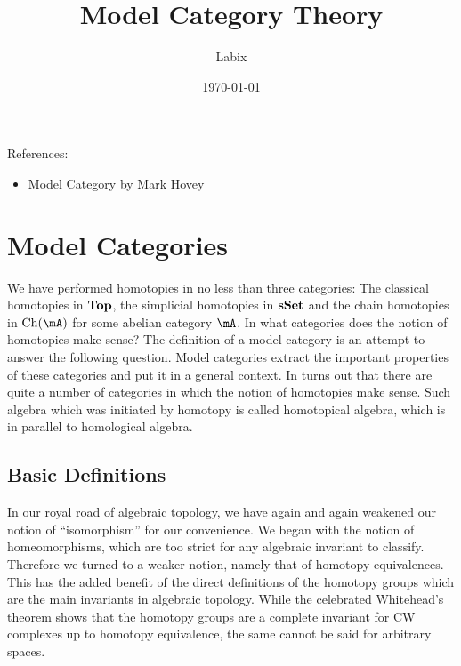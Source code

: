\documentclass[a4paper]{article}
\title{Model Category Theory}
\author{Labix}
\date{\today}
\begin{document}
\maketitle
\begin{abstract}

\end{abstract}
References: 
\begin{itemize}
\item Model Category by Mark Hovey
\end{itemize}
\pagebreak
\tableofcontents

\pagebreak
\section{Model Categories}
We have performed homotopies in no less than three categories: The classical homotopies in $\bold{Top}$, the simplicial homotopies in $\bold{sSet}$ and the chain homotopies in $\text{Ch}(\mA)$ for some abelian category $\mA$. In what categories does the notion of homotopies make sense? The definition of a model category is an attempt to answer the following question. Model categories extract the important properties of these categories and put it in a general context. In turns out that there are quite a number of categories in which the notion of homotopies make sense. Such algebra which was initiated by homotopy is called homotopical algebra, which is in parallel to homological algebra. 

\subsection{Basic Definitions}
In our royal road of algebraic topology, we have again and again weakened our notion of ``isomorphism'' for our convenience. We began with the notion of homeomorphisms, which are too strict for any algebraic invariant to classify. Therefore we turned to a weaker notion, namely that of homotopy equivalences. This has the added benefit of the direct definitions of the homotopy groups which are the main invariants in algebraic topology. While the celebrated Whitehead's theorem shows that the homotopy groups are a complete invariant for CW complexes up to homotopy equivalence, the same cannot be said for arbitrary spaces. \\~\\
\end{document}
